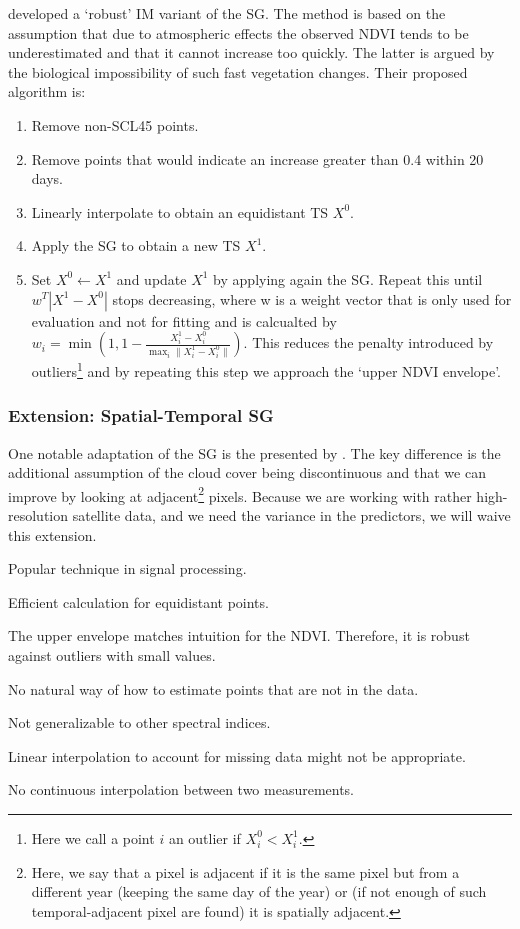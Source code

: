 		\cite{chenSimpleMethodReconstructing2004a} developed a `robust' {{IM}} variant of the SG. 
		The method is based on the assumption that due to atmospheric effects the observed NDVI tends to be underestimated and that it cannot increase too quickly. The latter is argued by the biological impossibility of such fast vegetation changes. Their proposed algorithm is:
			\begin{enumerate}
				\item Remove non-SCL45 points.
				\item Remove points that would indicate an increase greater than 0.4 within 20 days.
				\item Linearly interpolate to obtain an equidistant {TS} $X^0$.
				\item Apply the SG to obtain a new {TS} $X^1$.
				\item Set $X^0\leftarrow X^1$ and update $X^1$ by applying again the SG. Repeat this until $w^T |X^1-X^0|$ stops decreasing, where w is a weight vector that is only used for evaluation and not for fitting and is calcualted by $w_i = \min\left(1, 1 - \frac{X^1_i-X^0_i}{\max_i\|X^1_i-X^0_i\|}\right)$. This reduces the penalty introduced by outliers\footnote{Here we call a point $i$ an outlier if $X^0_i<X^1_i$.} and by repeating this step we approach the `upper NDVI envelope'.
			\end{enumerate}

		\subsubsection*{Extension: Spatial-Temporal SG}
			One notable adaptation of the SG is the presented by \cite{caoSimpleMethodImprove2018b}. The key difference is the additional assumption of the cloud cover being discontinuous and that we can improve by looking at adjacent\footnote{Here, we say that a pixel is adjacent if it is the same pixel but from a different year (keeping the same day of the year) or (if not enough of such temporal-adjacent pixel are found) it is spatially adjacent.} pixels. Because we are working with rather high-resolution satellite data, and we need the variance in the predictors, we will waive this extension.

		\begin{my_pros_cons_table}{
				\item Popular technique in signal processing.
				\item Efficient calculation for equidistant points.
				\item The upper envelope matches intuition for the NDVI. Therefore, it is robust against outliers with small values.
			}{
				\item No natural way of how to estimate points that are not in the data.
				\item Not generalizable to other spectral indices.
				\item Linear interpolation to account for missing data might not be appropriate.
				\item No continuous interpolation between two measurements.
			}
		\end{my_pros_cons_table}


